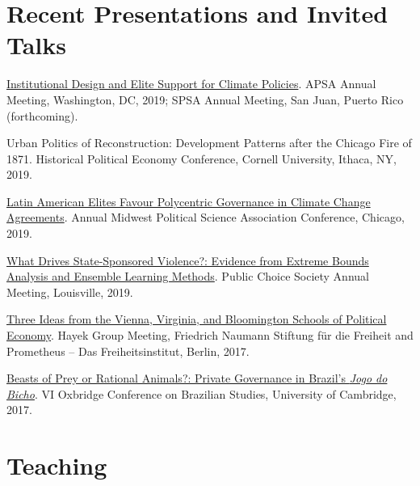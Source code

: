 \documentclass[a4paper]{article}
\renewenvironment{itemize}{
	\begin{list}{}{
			\setlength{\leftmargin}{1.5em}
		}
		}{
	\end{list}
}
\begin{document}
	\section*{Recent Presentations and Invited Talks}

	\begin{itemize}
		\item \href{https://osf.io/9a6ch}{Institutional Design and Elite Support for Climate Policies}. APSA Annual Meeting, Washington, DC, 2019; SPSA Annual Meeting, San Juan, Puerto Rico (forthcoming).
		\item Urban Politics of Reconstruction: Development Patterns after the Chicago Fire of 1871. Historical Political Economy Conference, Cornell University, Ithaca, NY, 2019.
		\item \href{https://osf.io/9a6ch}{Latin American Elites Favour Polycentric Governance in Climate Change Agreements}. Annual Midwest Political Science Association Conference, Chicago, 2019.
		\item \href{http://danilofreire.github.io/pcs-2019}{What Drives State-Sponsored Violence?: Evidence from Extreme Bounds Analysis and Ensemble Learning Methods}. Public Choice Society Annual Meeting, Louisville, 2019.
		\item \href{https://www.overleaf.com/project/591ef5259fb58ede3dc4d369}{Three Ideas from the Vienna, Virginia, and Bloomington Schools of Political Economy}. Hayek Group Meeting, Friedrich Naumann Stiftung f{\"u}r die Freiheit and Prometheus -- Das Freiheitsinstitut, Berlin, 2017.
		\item \href{https://osf.io/se2jr}{Beasts of Prey or Rational Animals?: Private Governance in Brazil's \emph{Jogo do Bicho}}. VI Oxbridge Conference on Brazilian Studies, University of Cambridge, 2017.
	\end{itemize}

	\section*{Teaching}
\end{document}
